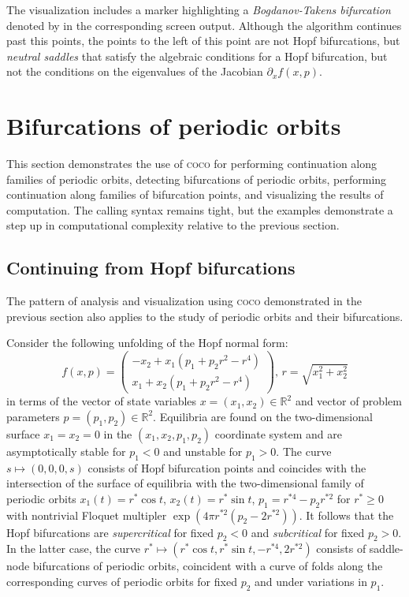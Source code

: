 The visualization includes a marker highlighting a \textit{Bogdanov-Takens bifurcation} denoted by  in the corresponding screen output. Although the algorithm continues past this points, the points to the left of this point are not Hopf bifurcations, but \textit{neutral saddles} that satisfy the algebraic conditions for a Hopf bifurcation, but not the conditions on the eigenvalues of the Jacobian $\partial_xf(x,p)$.

\section{Bifurcations of periodic orbits}
This section demonstrates the use of \textsc{coco} for performing continuation along families of periodic orbits, detecting bifurcations of periodic orbits, performing continuation along families of bifurcation points, and visualizing the results of computation. The calling syntax remains tight, but the examples demonstrate a step up in computational complexity relative to the previous section.

\subsection{Continuing from Hopf bifurcations}
\label{sec: Continuing from Hopf bifurcations}
The pattern of analysis and visualization using \textsc{coco} demonstrated in the previous section also applies to the study of periodic orbits and their bifurcations. 

Consider the following unfolding of the Hopf normal form:
\[
f(x,p)=\begin{pmatrix}-x_2+x_1(p_1+p_2r^2-r^4)\\x_1+x_2(p_1+p_2r^2-r^4)\end{pmatrix},\,r=\sqrt{x_1^2+x_2^2}
\]
in terms of the vector of state variables $x=(x_1,x_2)\in\mathbb{R}^2$ and vector of problem parameters $p=(p_1,p_2)\in\mathbb{R}^2$. Equilibria are found on the two-dimensional surface $x_1=x_2=0$ in the  $(x_1,x_2,p_1,p_2)$ coordinate system and are asymptotically stable for $p_1<0$ and unstable for $p_1>0$. The curve $s\mapsto(0,0,0,s)$ consists of Hopf bifurcation points and coincides with the intersection of the surface of equilibria with the two-dimensional family of periodic orbits $x_1(t)=r^*\cos t$, $x_2(t)=r^*\sin t$, $p_1=r^{*4}-p_2r^{*2}$ for $r^*\ge0$ with nontrivial Floquet multipler $\exp(4\pi r^{*2}(p_2-2r^{*2}))$. It follows that the Hopf bifurcations are \textit{supercritical} for fixed $p_2<0$ and \textit{subcritical} for fixed $p_2>0$. In the latter case, the curve $r^*\mapsto(r^*\cos t,r^*\sin t,-r^{*4},2r^{*2})$ consists of saddle-node bifurcations of periodic orbits, coincident with a curve of folds along the corresponding curves of periodic orbits for fixed $p_2$ and under variations in $p_1$.

